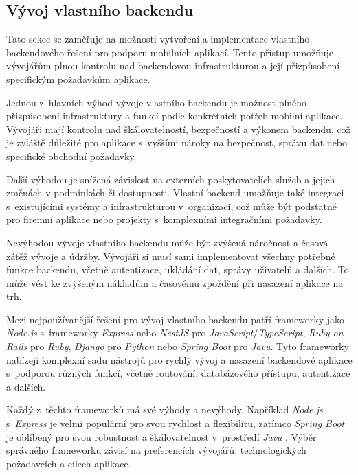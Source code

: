 \subsection{Vývoj vlastního backendu}

Tato sekce se zaměřuje na možnosti vytvoření a implementace vlastního backendového řešení pro podporu mobilních aplikací. Tento přístup umožňuje vývojářům plnou kontrolu nad backendovou infrastrukturou a její přizpůsobení specifickým požadavkům aplikace.

Jednou z~hlavních výhod vývoje vlastního backendu je možnost plného přizpůsobení infrastruktury a funkcí podle konkrétních potřeb mobilní aplikace. Vývojáři mají kontrolu nad škálovatelností, bezpečností a výkonem backendu, což je zvláště důležité pro aplikace s~vyššími nároky na bezpečnost, správu dat nebo specifické obchodní požadavky.

Další výhodou je snížená závislost na externích poskytovatelích služeb a jejich změnách v podmínkách či dostupnosti. Vlastní backend umožňuje také integraci s~existujícími systémy a infrastrukturou v~organizaci, což může být podstatné pro firemní aplikace nebo projekty s~komplexními integračními požadavky.

Nevýhodou vývoje vlastního backendu může být zvýšená náročnost a časová zátěž vývoje a údržby. Vývojáři si musí sami implementovat všechny potřebné funkce backendu, včetně autentizace, ukládání dat, správy uživatelů a dalších. To může vést ke zvýšeným nákladům a časovému zpoždění při nasazení aplikace na trh.

Mezi nejpoužívanější řešení pro vývoj vlastního backendu patří frameworky jako \emph{Node.js} \cite{node-js} s~frameworky \emph{Express} \cite{node-js-express} nebo \emph{NestJS} \cite{nest-js} pro \emph{JavaScript}/\emph{TypeScript}, \emph{Ruby on Rails} \cite{ruby-on-rails} pro \emph{Ruby}, \emph{Django} \cite{django} pro \emph{Python} nebo \emph{Spring Boot} \cite{spring-boot} pro \emph{Javu}. Tyto frameworky nabízejí komplexní sadu nástrojů pro rychlý vývoj a nasazení backendové aplikace s~podporou různých funkcí, včetně routování, databázového přístupu, autentizace a dalších.

Každý z~těchto frameworků má své výhody a nevýhody. Například \emph{Node.js} s~\emph{Express} je velmi populární pro svou rychlost a flexibilitu, zatímco \emph{Spring Boot} je oblíbený pro svou robustnost a škálovatelnost v~prostředí \emph{Java} \cite{spring-boot-vs-node-js}. Výběr správného frameworku závisí na preferencích vývojářů, technologických požadavcích a cílech aplikace.

